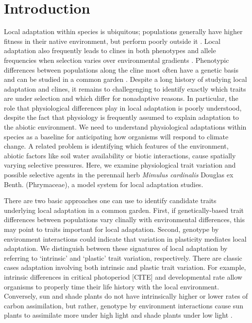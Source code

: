 \documentclass[11pt, oneside]{article}
\newcommand{\stretchy}{1.5}
\begin{document}
\setstretch{\stretchy}

\section*{Introduction}


Local adaptation within species is ubiquitous; populations generally have higher fitness in their native environment, but perform poorly outside it \citep{Schluter_2000, Hereford_2009}. Local adaptation also frequently leads to clines in both phenotypes and allele frequencies when selection varies over environmental gradients \citep{Huxley_1938, Endler_1977}. Phenotypic differences between populations along the cline most often have a genetic basis and can be studied in a common garden \citep{Turesson_1922, Clausen_etal_1940, Hiesey_etal_1942}. Despite a long history of studying local adaptation and clines, it remains to challegenging to identify exactly which traits are under selection and which differ for nonadaptive reasons. In particular, the role that physiological differences play in local adaptation is poorly understood, despite the fact that physiology is frequently assumed to explain adaptation to the abiotic environment. We need to understand physiological adaptations within species as a baseline for anticipating how organisms will respond to climate change. A related problem is identifying which features of the environment, abiotic factors like soil water availability or biotic interactions, cause spatially varying selective pressures. Here, we examine physiological trait variation and possible selective agents in the perennail herb \textit{Mimulus cardinalis} Douglas ex Benth. (Phrymaceae), a model system for local adaptation studies.

There are two basic approaches one can use to identify candidate traits underlying local adaptation in a common garden. First, if genetically-based trait differences between populations vary clinally with environmental differences, this may point to traits important for local adaptation. Second, genotype by environment interactions could indicate that variation in plasticity mediates local adaptation. We distinguish between these signatures of local adaptation by referring to `intrinsic' and `plastic' trait variation, respectively. There are classic cases adaptation involving both intrinsic and plastic trait variation. For example, intrinsic differences in critical photoperiod [CITE] and developmental rate \citep{Stinchcombe_etal_2004} allow organisms to properly time their life history with the local environment. Conversely, sun and shade plants do not have intrinsically higher or lower rates of carbon assimilation, but rather, genotype by environment interactions cause sun plants to assimilate more under high light and shade plants under low light \citep{Givnish_1988}.
\end{document}
